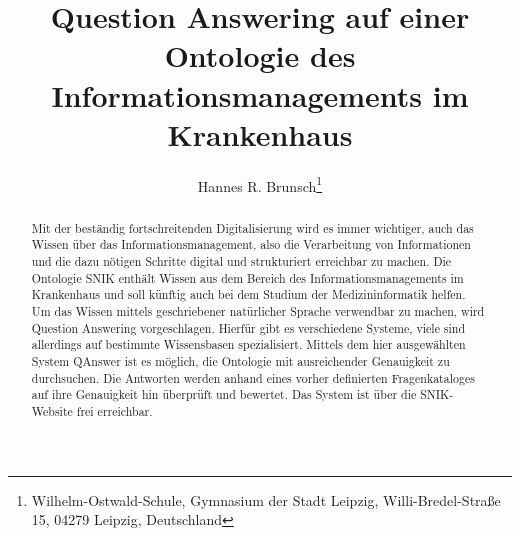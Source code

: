 \documentclass[utf8,biblatex]{lni}
\begin{document}
\title[Question Answering auf SNIK]{Question Answering auf einer Ontologie des Informationsmanagements im Krankenhaus}
\author[Hannes R. Brunsch]%
{Hannes R. Brunsch\footnote{Wilhelm-Ostwald-Schule, Gymnasium der Stadt Leipzig, Willi-Bredel-Straße 15, 04279 Leipzig, Deutschland }}
\maketitle

\begin{abstract}
Mit der beständig fortschreitenden Digitalisierung wird es immer wichtiger, auch das Wissen über das Informationsmanagement,
also die Verarbeitung von Informationen und die dazu nötigen Schritte digital und strukturiert erreichbar zu machen.
Die Ontologie SNIK enthält Wissen aus dem Bereich des Informationsmanagements im Krankenhaus und soll künftig auch bei dem Studium der Medizininformatik helfen.
Um das Wissen mittels geschriebener natürlicher Sprache verwendbar zu machen, wird Question Answering vorgeschlagen.
Hierfür gibt es verschiedene Systeme, viele sind allerdings auf bestimmte Wissensbasen spezialisiert.
Mittels dem hier ausgewählten System QAnswer ist es möglich, die Ontologie mit ausreichender Genauigkeit zu durchsuchen.
Die Antworten werden anhand eines vorher definierten Fragenkataloges auf ihre Genauigkeit hin überprüft und bewertet.
Das System ist über die SNIK-Website frei erreichbar.
\end{abstract}

\end{document}
